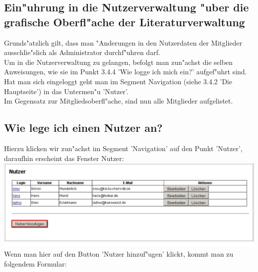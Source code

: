 \subsection{Ein"uhrung in die Nutzerverwaltung "uber die grafische Oberfl"ache der Literaturverwaltung}
Grunds"atzlich gilt, dass man "Anderungen in den Nutzerdaten der Mitglieder ausschlie"slich als Administrator durchf"uhren darf.\\
Um in die Nutzerverwaltung zu gelangen, befolgt man zun"achst die selben Anweisungen, wie sie im Punkt 3.4.4 'Wie logge ich mich ein?' aufgef"uhrt sind.\\
Hat man sich eingeloggt geht man im Segment Navigation (siehe 3.4.2 'Die Hauptseite') in das Untermen"u 'Nutzer'.\\
Im Gegensatz zur Mitgliedsoberfl"ache, sind nun alle Mitglieder aufgelistet.

\subsection{Wie lege ich einen Nutzer an?}
Hierzu klicken wir zun"achst im Segment 'Navigation' auf den Punkt 'Nutzer', daraufhin erscheint das Fenster Nutzer:\\
\includegraphics[scale=0.5]{nutzeranl}\\
Wenn man hier auf den Button 'Nutzer hinzuf"ugen' klickt, kommt man zu folgendem Formular:\\


